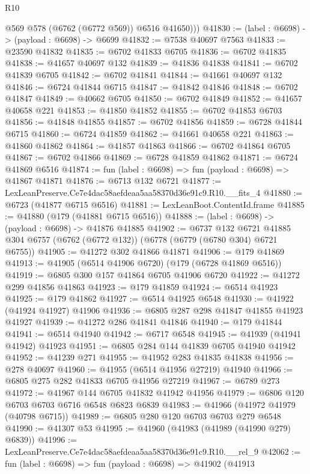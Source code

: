 \begin{lexlean}{R10}
\begin{coremodule}
          @569
          @578
          (@6762 (@6772 @569))
          @6516
          @41650)))
@41830 := (label : @6698) -> (payload : @6698) -> @6699
@41832 := @7538 @40697 @7563
@41833 := @23590 @41832
@41835 := @6702 @41833 @6705
@41836 := @6702 @41835
@41838 := @41657 @40697 @132
@41839 := @41836 @41838
@41841 := @6702 @41839 @6705
@41842 := @6702 @41841
@41844 := @41661 @40697 @132
@41846 := @6724 @41844 @6715
@41847 := @41842 @41846
@41848 := @6702 @41847
@41849 := @40662 @6705
@41850 := @6702 @41849
@41852 := @41657 @40658 @221
@41853 := @41850 @41852
@41855 := @6702 @41853 @6703
@41856 := @41848 @41855
@41857 := @6702 @41856
@41859 := @6728 @41844 @6715
@41860 := @6724 @41859
@41862 := @41661 @40658 @221
@41863 := @41860 @41862
@41864 := @41857 @41863
@41866 := @6702 @41864 @6705
@41867 := @6702 @41866
@41869 := @6728 @41859 @41862
@41871 := @6724 @41869 @6516
@41874 := fun (label : @6698) => fun (payload : @6698) => @41867 @41871
@41876 := @6713 @132 @6721
@41877 := LexLeanPreserve.Ce7e4dac58aefdeaa5aa58370d36e91c9.R10.__fits_4
@41880 := @6723 (@41877 @6715 @6516)
@41881 := LexLeanBoot.ContentId.frame
@41885 := @41880 (@179 (@41881 @6715 @6516))
@41888 := (label : @6698) -> (payload : @6698) -> @41876 @41885
@41902 := @6737
    @132
    @6721
    @41885
    @304
    @6757
    (@6762 (@6772 @132))
    (@6778 (@6779 (@6780 @304) @6721 @6755))
@41905 := @41272 @302 @41866 @41871
@41906 := @179 @41869
@41913 := @41905 (@6514 @41906 @6720) (@179 (@6728 @41869 @6516))
@41919 := @6805 @300 @157 @41864 @6705 @41906 @6720
@41922 := @41272 @299 @41856 @41863
@41923 := @179 @41859
@41924 := @6514 @41923
@41925 := @179 @41862
@41927 := @6514 @41925 @6548
@41930 := @41922 (@41924 @41927) @41906
@41936 := @6805 @287 @298 @41847 @41855 @41923 @41927
@41939 := @41272 @286 @41841 @41846
@41940 := @179 @41844
@41941 := @6514 @41940
@41942 := @6717 @6548
@41945 := @41939 (@41941 @41942) @41923
@41951 := @6805 @284 @144 @41839 @6705 @41940 @41942
@41952 := @41239 @271
@41955 := @41952 @283 @41835 @41838
@41956 := @278 @40697
@41960 := @41955 (@6514 @41956 @27219) @41940
@41966 := @6805 @275 @282 @41833 @6705 @41956 @27219
@41967 := @6789 @273
@41972 := @41967 @144 @6705 @41832 @41942 @41956
@41979 := @6806 @120 @6703 @6703 @6716 @6548 @6823 @6839
@41983 := @41966 (@41972 @41979 (@40798 @6715))
@41989 := @6805 @280 @120 @6703 @6703 @279 @6548
@41990 := @41307 @53
@41995 := @41960 (@41983 (@41989 (@41990 @279) @6839))
@41996 := LexLeanPreserve.Ce7e4dac58aefdeaa5aa58370d36e91c9.R10.__rel_9
@42062 := fun (label : @6698) =>
  fun (payload : @6698) =>
  @41902
    (@41913

\end{coremodule}
\end{lexlean}
